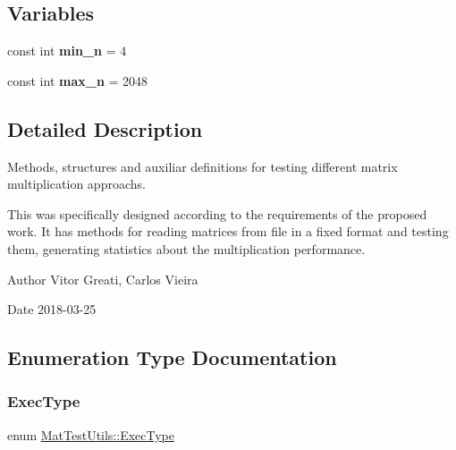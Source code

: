 \subsection*{Variables}
\begin{DoxyCompactItemize}
\item 
\mbox{\label{namespaceMatTestUtils_ac809b72319e3d38f960650baf31dc1e6}} 
const int {\bfseries min\+\_\+n} = 4
\item 
\mbox{\label{namespaceMatTestUtils_aae57ce6440d799106e6f95f6094b2d6d}} 
const int {\bfseries max\+\_\+n} = 2048
\end{DoxyCompactItemize}


\subsection{Detailed Description}
Methods, structures and auxiliar definitions for testing different matrix multiplication approachs. 

This was specifically designed according to the requirements of the proposed work. It has methods for reading matrices from file in a fixed format and testing them, generating statistics about the multiplication performance.

\begin{DoxyAuthor}{Author}
Vitor Greati, Carlos Vieira 
\end{DoxyAuthor}
\begin{DoxyDate}{Date}
2018-\/03-\/25 
\end{DoxyDate}


\subsection{Enumeration Type Documentation}
\mbox{\label{namespaceMatTestUtils_a8ce892071d861e65dd62ef377efaaa6b}} 
\subsubsection{\texorpdfstring{Exec\+Type}{ExecType}}
{\footnotesize\ttfamily enum \mbox{\hyperlink{namespaceMatTestUtils_a8ce892071d861e65dd62ef377efaaa6b}{Mat\+Test\+Utils\+::\+Exec\+Type}}}



